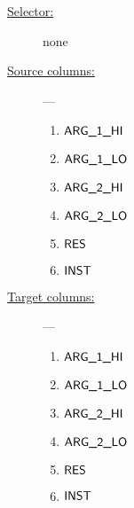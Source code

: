 \begin{description}
	\item[\underline{Selector:}] none
	\item[\underline{Source columns:}] ---
		\begin{multicols}{3}
			\begin{enumerate}
				\item $\textsf{ARG}\textsf{\_1}\textsf{\_HI}$
				\item $\textsf{ARG}\textsf{\_1}\textsf{\_LO}$
				\item $\textsf{ARG}\textsf{\_2}\textsf{\_HI}$
				\item $\textsf{ARG}\textsf{\_2}\textsf{\_LO}$
				\item $\textsf{RES}$
				\item $\textsf{INST}$
			\end{enumerate}
		\end{multicols}
	\item[\underline{Target columns:}] ---
		\begin{multicols}{3}
		\begin{enumerate}
			\item $\textsf{ARG}\textsf{\_1}\textsf{\_HI}$
			\item $\textsf{ARG}\textsf{\_1}\textsf{\_LO}$
			\item $\textsf{ARG}\textsf{\_2}\textsf{\_HI}$
			\item $\textsf{ARG}\textsf{\_2}\textsf{\_LO}$
			\item $\textsf{RES}$
			\item $\textsf{INST}$
		\end{enumerate}
		\end{multicols}
\end{description}